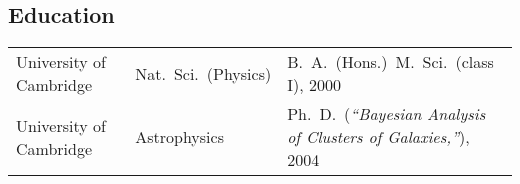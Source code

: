 \subsection*{Education}

\begin{tabular}{@{}p{4.8cm}p{3.0cm}p{10.5cm}}
University of Cambridge    &  Nat.\ Sci.\ (Physics) & B.\ A.\ (Hons.)\, M.\ Sci.\ (class I), 2000 \\
University of Cambridge    &  Astrophysics               & Ph.\ D.\ (\textit{``Bayesian Analysis of Clusters of Galaxies,''}), 2004 \\
\end{tabular}
